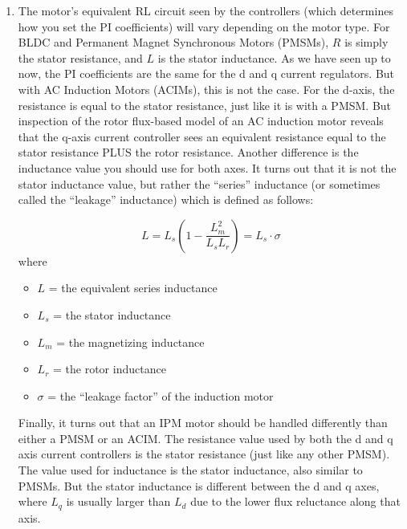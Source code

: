 \begin{enumerate}
    \item The motor’s equivalent RL circuit seen by the controllers (which determines how you set the PI coefficients) will vary depending on the motor type.  For BLDC and Permanent Magnet Synchronous Motors (PMSMs), $R$ is simply the stator resistance, and $L$ is the stator inductance.  As we have seen up to now, the PI coefficients are the same for the d and q current regulators.  But with AC Induction Motors (ACIMs), this is not the case.  For the d-axis, the resistance is equal to the stator resistance, just like it is with a PMSM.  But inspection of the rotor flux-based model of an AC induction motor reveals that the q-axis current controller sees an equivalent resistance equal to the stator resistance PLUS the rotor resistance.  Another difference is the inductance value you should use for both axes.  It turns out that it is not the stator inductance value, but rather the “series” inductance (or sometimes called the “leakage” inductance) which is defined as follows:

    \begin{equation}\label{eq:9_1}
        L = L_s \left(1-\frac{L_m^2}{L_sL_r}\right) = L_s \cdot \sigma
    \end{equation}
    where
    \begin{itemize}
        \item  $L$ = the equivalent series inductance
        \item  $L_s$ = the stator inductance
        \item  $L_m$ = the magnetizing inductance
        \item  $L_r$ = the rotor inductance
        \item  $\sigma$ = the “leakage factor” of the induction motor
    \end{itemize}

    Finally, it turns out that an IPM motor should be handled differently than either a PMSM or an ACIM.  The resistance value used by both the d and q axis current controllers is the stator resistance (just like any other PMSM).  The value used for inductance is the stator inductance, also similar to PMSMs.  But the stator inductance is different between the d and q axes, where $L_q$ is usually larger than $L_d$ due to the lower flux reluctance along that axis.


\end{enumerate}
